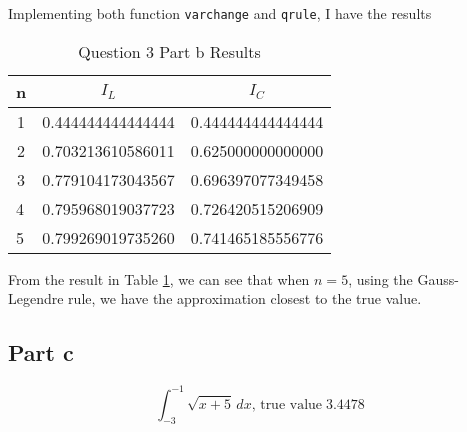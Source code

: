 \begin{answer}
     Implementing both function \verb+varchange+ and \verb+qrule+, I have the results
    \begin{table}[H]
    \centering
    \caption{Question 3 Part b Results}
    \label{tab:tab2}
    \begin{tabular}{|c|c|c|}
    \hline
    \textbf{n}              & \textbf{$I_L$}                            & \textbf{$I_C$}                            \\ \hline
    1                       & 0.444444444444444                      & 0.444444444444444                      \\ \hline
    2                       & 0.703213610586011                      & 0.625000000000000                      \\ \hline
    3                       & 0.779104173043567                      & 0.696397077349458                      \\ \hline
    \multicolumn{1}{|l|}{4} & \multicolumn{1}{l|}{0.795968019037723} & \multicolumn{1}{l|}{0.726420515206909} \\ \hline
    \multicolumn{1}{|l|}{5} & \multicolumn{1}{l|}{0.799269019735260} & \multicolumn{1}{l|}{0.741465185556776} \\ \hline
    \end{tabular}
    \end{table}
    From the result in Table \ref{tab:tab2}, we can see that when $n = 5$, using the Gauss-Legendre rule, we have the approximation closest to the true value.
\end{answer}

\subsection{Part c}

\begin{question}
    \begin{equation}
        \int_{-3}^{-1} \sqrt{x+5}\, dx\text{, true value}\; 3.4478
    \end{equation}
\end{question}

